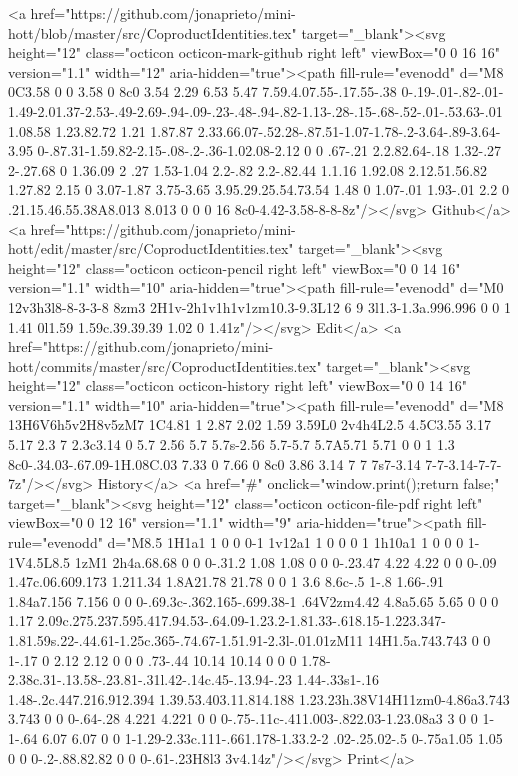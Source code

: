       <a href="https://github.com/jonaprieto/mini-hott/blob/master/src/CoproductIdentities.tex" target="_blank"><svg height="12" class="octicon octicon-mark-github right left" viewBox="0 0 16 16" version="1.1" width="12" aria-hidden="true"><path fill-rule="evenodd" d="M8 0C3.58 0 0 3.58 0 8c0 3.54 2.29 6.53 5.47 7.59.4.07.55-.17.55-.38 0-.19-.01-.82-.01-1.49-2.01.37-2.53-.49-2.69-.94-.09-.23-.48-.94-.82-1.13-.28-.15-.68-.52-.01-.53.63-.01 1.08.58 1.23.82.72 1.21 1.87.87 2.33.66.07-.52.28-.87.51-1.07-1.78-.2-3.64-.89-3.64-3.95 0-.87.31-1.59.82-2.15-.08-.2-.36-1.02.08-2.12 0 0 .67-.21 2.2.82.64-.18 1.32-.27 2-.27.68 0 1.36.09 2 .27 1.53-1.04 2.2-.82 2.2-.82.44 1.1.16 1.92.08 2.12.51.56.82 1.27.82 2.15 0 3.07-1.87 3.75-3.65 3.95.29.25.54.73.54 1.48 0 1.07-.01 1.93-.01 2.2 0 .21.15.46.55.38A8.013 8.013 0 0 0 16 8c0-4.42-3.58-8-8-8z"/></svg> Github</a>
      <a href="https://github.com/jonaprieto/mini-hott/edit/master/src/CoproductIdentities.tex" target="_blank"><svg height="12" class="octicon octicon-pencil right left" viewBox="0 0 14 16" version="1.1" width="10" aria-hidden="true"><path fill-rule="evenodd" d="M0 12v3h3l8-8-3-3-8 8zm3 2H1v-2h1v1h1v1zm10.3-9.3L12 6 9 3l1.3-1.3a.996.996 0 0 1 1.41 0l1.59 1.59c.39.39.39 1.02 0 1.41z"/></svg> Edit</a>
      <a href="https://github.com/jonaprieto/mini-hott/commits/master/src/CoproductIdentities.tex" target="_blank"><svg height="12" class="octicon octicon-history right left" viewBox="0 0 14 16" version="1.1" width="10" aria-hidden="true"><path fill-rule="evenodd" d="M8 13H6V6h5v2H8v5zM7 1C4.81 1 2.87 2.02 1.59 3.59L0 2v4h4L2.5 4.5C3.55 3.17 5.17 2.3 7 2.3c3.14 0 5.7 2.56 5.7 5.7s-2.56 5.7-5.7 5.7A5.71 5.71 0 0 1 1.3 8c0-.34.03-.67.09-1H.08C.03 7.33 0 7.66 0 8c0 3.86 3.14 7 7 7s7-3.14 7-7-3.14-7-7-7z"/></svg> History</a>
      <a  href="#" onclick="window.print();return false;" target="_blank"><svg height="12" class="octicon octicon-file-pdf right left" viewBox="0 0 12 16" version="1.1" width="9" aria-hidden="true"><path fill-rule="evenodd" d="M8.5 1H1a1 1 0 0 0-1 1v12a1 1 0 0 0 1 1h10a1 1 0 0 0 1-1V4.5L8.5 1zM1 2h4a.68.68 0 0 0-.31.2 1.08 1.08 0 0 0-.23.47 4.22 4.22 0 0 0-.09 1.47c.06.609.173 1.211.34 1.8A21.78 21.78 0 0 1 3.6 8.6c-.5 1-.8 1.66-.91 1.84a7.156 7.156 0 0 0-.69.3c-.362.165-.699.38-1 .64V2zm4.42 4.8a5.65 5.65 0 0 0 1.17 2.09c.275.237.595.417.94.53-.64.09-1.23.2-1.81.33-.618.15-1.223.347-1.81.59s.22-.44.61-1.25c.365-.74.67-1.51.91-2.3l-.01.01zM11 14H1.5a.743.743 0 0 1-.17 0 2.12 2.12 0 0 0 .73-.44 10.14 10.14 0 0 0 1.78-2.38c.31-.13.58-.23.81-.31l.42-.14c.45-.13.94-.23 1.44-.33s1-.16 1.48-.2c.447.216.912.394 1.39.53.403.11.814.188 1.23.23h.38V14H11zm0-4.86a3.743 3.743 0 0 0-.64-.28 4.221 4.221 0 0 0-.75-.11c-.411.003-.822.03-1.23.08a3 3 0 0 1-1-.64 6.07 6.07 0 0 1-1.29-2.33c.111-.661.178-1.33.2-2 .02-.25.02-.5 0-.75a1.05 1.05 0 0 0-.2-.88.82.82 0 0 0-.61-.23H8l3 3v4.14z"/></svg> Print</a>
